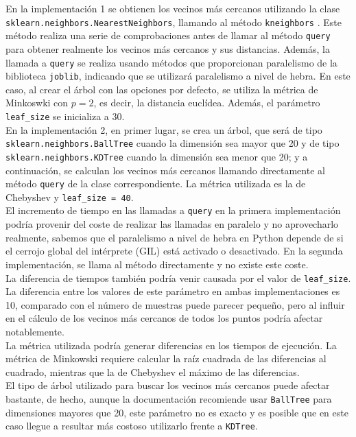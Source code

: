 \documentclass[12pt,a4paper]{report} %
\theoremstyle{definition}
\begin{document}
En la implementación 1 se obtienen los vecinos más cercanos utilizando la clase \texttt{sklearn.neighbors.NearestNeighbors}, llamando al método \texttt{kneighbors} \cite{imp_kneighbors}. Este método realiza una serie de comprobaciones antes de llamar al método \texttt{query} para obtener realmente los vecinos más cercanos y sus distancias. Además, la llamada a \texttt{query} se realiza usando métodos que proporcionan paralelismo de la biblioteca \texttt{joblib}, indicando que se utilizará paralelismo a nivel de hebra. En este caso, al crear el árbol con las opciones por defecto, se utiliza la métrica de Minkoswki con $p=2$, es decir, la distancia euclídea. Además, el parámetro \texttt{leaf\_size} se inicializa a 30.\\

En la implementación 2, en primer lugar, se crea un árbol, que será de tipo \texttt{sklearn.neighbors.BallTree} cuando la dimensión sea mayor que 20 y de tipo \texttt{sklearn.neighbors.KDTree} cuando la dimensión sea menor que 20; y a continuación, se calculan los vecinos más cercanos llamando directamente al método \texttt{query} de la clase correspondiente. La métrica utilizada es la de Chebyshev y \texttt{leaf\_size = 40}.\\

El incremento de tiempo en las llamadas a \texttt{query} en la primera implementación podría provenir del coste de realizar las llamadas en paralelo y no aprovecharlo realmente, sabemos que el paralelismo a nivel de hebra en Python depende de si el cerrojo global del intérprete (GIL) está activado o desactivado. En la segunda implementación,  se llama al método directamente y no existe este coste.\\

La diferencia de tiempos también podría venir causada por el valor de \texttt{leaf\_size}. La diferencia entre los valores de este parámetro en ambas implementaciones es 10, comparado con el número de muestras puede parecer pequeño, pero al influir en el cálculo de los vecinos más cercanos de todos los puntos podría afectar notablemente.\\

La métrica utilizada podría generar diferencias en los tiempos de ejecución. La métrica de Minkowski requiere calcular la raíz cuadrada de las diferencias al cuadrado, mientras que la de Chebyshev el máximo de las diferencias.\\ 

El tipo de árbol utilizado para buscar los vecinos más cercanos puede afectar bastante, de hecho, aunque la documentación recomiende usar \texttt{BallTree} para dimensiones mayores que 20, este parámetro no es exacto y es posible que en este caso llegue a resultar más costoso utilizarlo frente a \texttt{KDTree}.\\
\end{document}
